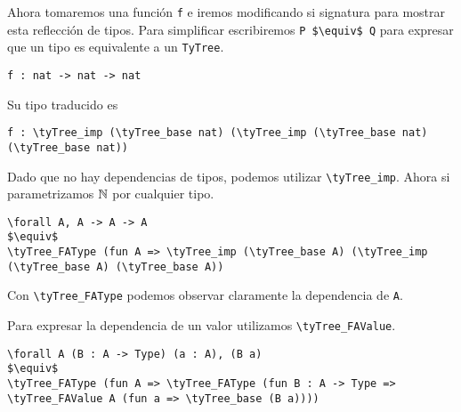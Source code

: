 Ahora tomaremos una función \lstinline{f} e iremos modificando si signatura para mostrar esta reflección de tipos.
Para simplificar escribiremos \lstinline{P $\equiv$ Q} para expresar que un tipo es equivalente a un \lstinline{TyTree}.

\begin{lstlisting}
f : nat -> nat -> nat
\end{lstlisting}

Su tipo traducido es

\begin{lstlisting}
f : \tyTree_imp (\tyTree_base nat) (\tyTree_imp (\tyTree_base nat) (\tyTree_base nat))
\end{lstlisting}

Dado que no hay dependencias de tipos, podemos utilizar \lstinline{\tyTree_imp}. Ahora si parametrizamos
$\mathbb{N}$ por cualquier tipo.

\begin{lstlisting}
\forall A, A -> A -> A
$\equiv$
\tyTree_FAType (fun A => \tyTree_imp (\tyTree_base A) (\tyTree_imp (\tyTree_base A) (\tyTree_base A))
\end{lstlisting}

Con \lstinline{\tyTree_FAType} podemos observar claramente la dependencia de \lstinline{A}.

Para expresar la dependencia de un valor utilizamos \lstinline{\tyTree_FAValue}.

\begin{lstlisting}
\forall A (B : A -> Type) (a : A), (B a)
$\equiv$
\tyTree_FAType (fun A => \tyTree_FAType (fun B : A -> Type => \tyTree_FAValue A (fun a => \tyTree_base (B a))))
\end{lstlisting}



